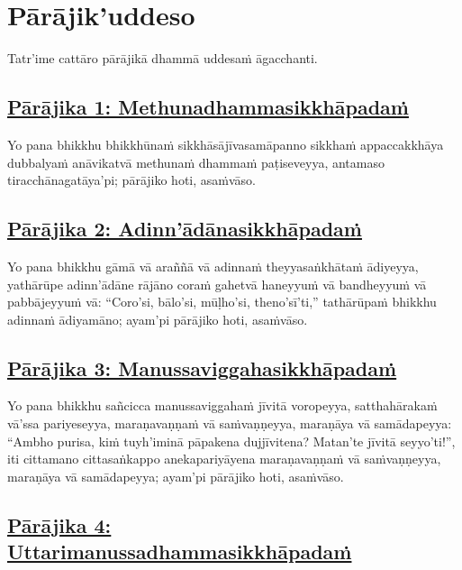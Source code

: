 
\section{Pārājik'uddeso}
\label{par}

\begin{intro}
	Tatr'ime cattāro pārājikā dhammā uddesaṁ āgacchanti.
\end{intro}

\setsubsecheadstyle{\subsubsectionFmt}
\subsection*{\hyperref[disq1]{Pārājika 1: Methunadhammasikkhāpadaṁ}}
\label{par1}

Yo pana bhikkhu bhikkhūnaṁ sikkhāsājīvasamāpanno sikkhaṁ appaccakkhāya dubbalyaṁ anāvikatvā methunaṁ dhammaṁ paṭiseveyya, antamaso tiracchānagatāya'pi; pārājiko hoti, asaṁvāso.



\subsection*{\hyperref[disq2]{Pārājika 2: Adinn'ādānasikkhāpadaṁ}}
\label{par2}

Yo pana bhikkhu gāmā vā araññā vā adinnaṁ theyyasaṅkhātaṁ ādiyeyya, yathārūpe adinn'ādāne rājāno coraṁ gahetvā haneyyuṁ vā bandheyyuṁ vā pabbājeyyuṁ vā: ``Coro'si, bālo'si, mūḷho'si, theno'sī'ti,'' tathārūpaṁ bhikkhu adinnaṁ ādiyamāno; ayam'pi pārājiko hoti, asaṁvāso.



\subsection*{\hyperref[disq3]{Pārājika 3: Manussaviggahasikkhāpadaṁ}}
\label{par3}

Yo pana bhikkhu sañcicca manussaviggahaṁ jīvitā voropeyya, satthahārakaṁ vā'ssa pariyeseyya, maraṇavaṇṇaṁ vā saṁvaṇṇeyya, maraṇāya vā samādapeyya: ``Ambho purisa, kiṁ tuyh'iminā pāpakena dujjīvitena? Matan'te jīvitā seyyo'ti!'', iti cittamano cittasaṅkappo anekapariyāyena maraṇavaṇṇaṁ vā saṁvaṇṇeyya, maraṇāya vā samādapeyya; ayam'pi pārājiko hoti, asaṁvāso.



\subsection*{\hyperref[disq4]{Pārājika 4: Uttarimanussadhammasikkhāpadaṁ}}

